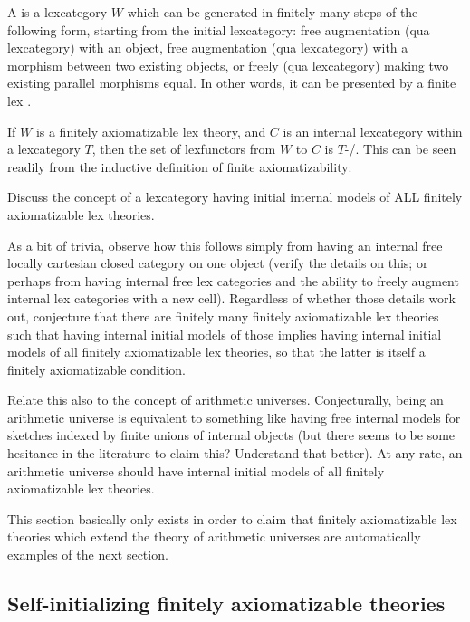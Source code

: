 \begin{definition}
A  is a lexcategory $W$ which can be generated in finitely many steps of the following form, starting from the initial lexcategory: free augmentation (qua lexcategory) with an object, free augmentation (qua lexcategory) with a morphism between two existing objects, or freely (qua lexcategory) making two existing parallel morphisms equal. In other words, it can be presented by a finite lex .
\end{definition}

If $W$ is a finitely axiomatizable lex theory, and $C$ is an internal lexcategory within a lexcategory $T$, then the set of lexfunctors from $W$ to $C$ is $T$-\repsmall/. This can be seen readily from the inductive definition of finite axiomatizability: 

\begin{TODOblock}
Discuss the concept of a lexcategory having initial internal models of ALL finitely axiomatizable lex theories.

As a bit of trivia, observe how this follows simply from having an internal free locally cartesian closed category on one object (verify the details on this; or perhaps from having internal free lex categories and the ability to freely augment internal lex categories with a new cell). Regardless of whether those details work out, conjecture that there are finitely many finitely axiomatizable lex theories such that having internal initial models of those implies having internal initial models of all finitely axiomatizable lex theories, so that the latter is itself a finitely axiomatizable condition.

Relate this also to the concept of arithmetic universes. Conjecturally, being an arithmetic universe is equivalent to something like having free internal models for sketches indexed by finite unions of internal objects (but there seems to be some hesitance in the literature to claim this? Understand that better). At any rate, an arithmetic universe should have internal initial models of all finitely axiomatizable lex theories.

This section basically only exists in order to claim that finitely axiomatizable lex theories which extend the theory of arithmetic universes are automatically examples of the next section.
\end{TODOblock}

\subsection{Self-initializing finitely axiomatizable theories}

